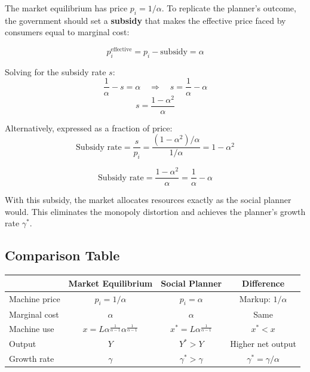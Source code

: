\begin{derivationbox}
The market equilibrium has price $p_i = 1/\alpha$. To replicate the planner's
outcome, the government should set a \textbf{subsidy} that makes the
effective price faced by consumers equal to marginal cost:

\[
p_i^{\text{effective}} = p_i - \text{subsidy} = \alpha
\]

Solving for the subsidy rate $s$:
\[
\frac{1}{\alpha} - s = \alpha \quad \Rightarrow \quad s = \frac{1}{\alpha} - \alpha
\]
\[
\boxed{s = \frac{1-\alpha^2}{\alpha}}
\]

Alternatively, expressed as a fraction of price:
\[
\text{Subsidy rate} = \frac{s}{p_i} = \frac{(1-\alpha^2)/\alpha}{1/\alpha} = 1 - \alpha^2
\]
\end{derivationbox}

\begin{resultbox}
\[
\boxed{\text{Subsidy rate} = \frac{1-\alpha^2}{\alpha} = \frac{1}{\alpha} - \alpha}
\]

With this subsidy, the market allocates resources exactly as the social planner would.
This eliminates the monopoly distortion and achieves the planner's growth rate $\gamma^*$.
\end{resultbox}

\subsection{Comparison Table}

\begin{center}
\begin{tabular}{lccc}
\toprule
 & \textbf{Market Equilibrium} & \textbf{Social Planner} & \textbf{Difference} \\
\midrule
Machine price & $p_i = 1/\alpha$ & $p_i = \alpha$ & Markup: $1/\alpha$ \\
Marginal cost & $\alpha$ & $\alpha$ & Same \\
Machine use & $x = L \alpha^{\frac{1}{\alpha-1}} \alpha^{\frac{1}{\alpha-1}}$ & $x^* = L \alpha^{\frac{1}{\alpha-1}}$ & $x^* < x$ \\
Output & $Y$ & $Y^* > Y$ & Higher net output \\
Growth rate & $\gamma$ & $\gamma^* > \gamma$ & $\gamma^* = \gamma / \alpha$ \\
\bottomrule
\end{tabular}
\end{center}


